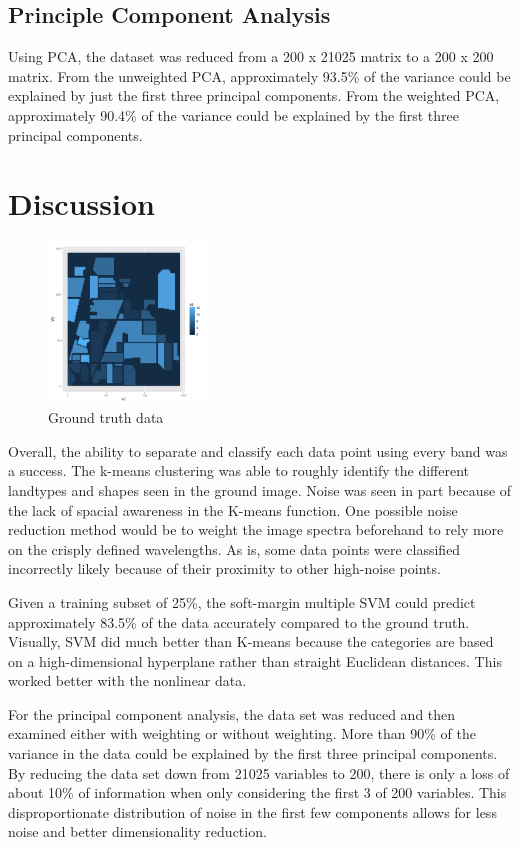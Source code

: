 \documentclass[10pt,letterpaper]{article}
\begin{document}
\subsection{Principle Component Analysis}
Using PCA, the dataset was reduced from a 200 x 21025 matrix to a 200 x 200 matrix. From the unweighted PCA, approximately 93.5\% of the variance could be explained by just the first three principal components. From the weighted PCA, approximately 90.4\% of the variance could be explained by the first three principal components.
\section{Discussion}
\begin{figure}
\begin{center}
\includegraphics[width=0.38\textwidth]{../Presentation/gt.png}
\caption{Ground truth data}
\end{center}
\end{figure}

Overall, the ability to separate and classify each data point using every band was a success. The k-means clustering was able to roughly identify the different landtypes and shapes seen in the ground image. Noise was seen in part because of the lack of spacial awareness in the K-means function. One possible noise reduction method would be to weight the image spectra beforehand to rely more on the crisply defined wavelengths. As is, some data points were classified incorrectly likely because of their proximity to other high-noise points.

Given a training subset of 25\%, the soft-margin multiple SVM could predict approximately 83.5\% of the data accurately compared to the ground truth. Visually, SVM did much better than K-means because the categories are based on a high-dimensional hyperplane rather than straight Euclidean distances. This worked better with the nonlinear data.

For the principal component analysis, the data set was reduced and then examined either with weighting or without weighting. More than 90\% of the variance in the data could be explained by the first three principal components. By reducing the data set down from 21025 variables to 200, there is only a loss of about 10\% of information when only considering the first 3 of 200 variables. This disproportionate distribution of noise in the first few components allows for less noise and better dimensionality reduction. 
\end{document}
